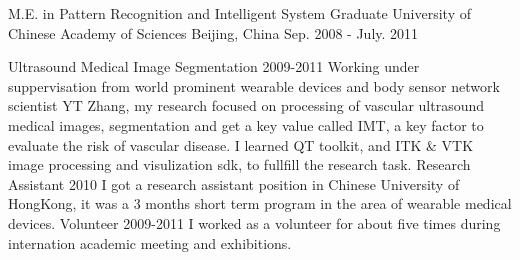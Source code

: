 

\begin{cventries}

  \cventry
   {M.E. in Pattern Recognition and Intelligent System}
   {Graduate University of Chinese Academy of Sciences}
   {Beijing, China}
   {Sep. 2008 - July. 2011}
   {
     \begin{cvsubentries}
       \cvsubentry
         {}
         {Ultrasound Medical Image Segmentation}
         {2009-2011}
         {Working under suppervisation from world prominent wearable devices and body sensor network scientist YT Zhang, my research focused on processing of vascular ultrasound medical images, segmentation and get a key value called IMT, a key factor to evaluate the risk of vascular disease. I learned QT toolkit, and ITK \& VTK image processing and visulization sdk, to fullfill the research task.}
       \cvsubentry
         {}
         {Research Assistant}
         {2010}
         {I got a research assistant position in Chinese University of HongKong, it was a 3 months short term program in the area of wearable medical devices.}
       \cvsubentry
         {}
         {Volunteer}
         {2009-2011}
         {I worked as a volunteer for about five times during internation academic meeting and exhibitions.}
     \end{cvsubentries}
   }
   

\end{cventries}
